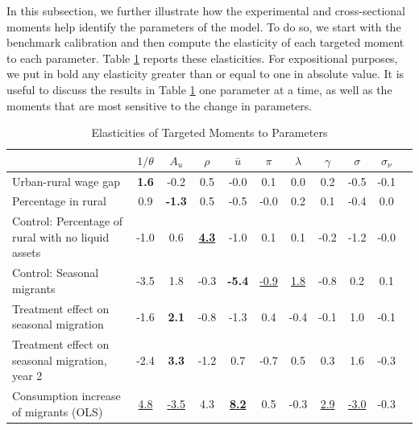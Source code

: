\documentclass[12pt,pdftex]{article}
\renewcommand{\arraystretch}{1.1}
\begin{document}
In this subsection, we further illustrate how the experimental and cross-sectional moments help identify the parameters of the model. To do so, we start with the benchmark calibration and then compute the elasticity of each targeted moment to each parameter. Table \ref{ta:elast} reports these elasticities. For expositional purposes, we put in bold any elasticity greater than or equal to one in absolute value. It is useful to discuss the results in Table \ref{ta:elast} one parameter at a time, as well as the moments that are most sensitive to the change in parameters.

\begin{table}[!h]
\small
\setlength {\tabcolsep}{2mm}
\renewcommand{\arraystretch}{1.3}
\begin{center}
\caption{Elasticities of Targeted Moments to Parameters \label{ta:elast}}
\vspace{0.3cm}
\begin{tabular}{l c c c c c c c c c c}

\hline \hline

& $1/\theta$ & $A_u$ & $\rho$ & $\bar{u}$  & $\pi$ & $\lambda$ & $\gamma$ & $\sigma$  & $\sigma_\nu$ \\


\hline

Urban-rural wage gap & \textbf{1.6} & -0.2 & 0.5 & -0.0 & 0.1 & 0.0 & 0.2  & -0.5 & -0.1 \\

Percentage in rural & 0.9 & \textbf{-1.3} & 0.5 & -0.5 & -0.0 & 0.2 & 0.1 & -0.4 & 0.0 \\

Control: Percentage of rural with no liquid assets & -1.0 & 0.6 & \underline{\textbf{4.3}} & -1.0 & 0.1 & 0.1 & -0.2 & -1.2 & -0.0 \\

Control: Seasonal migrants & -3.5 & 1.8 & -0.3 & \textbf{-5.4} & \underline{-0.9} & \underline{1.8} & -0.8  & 0.2 & 0.1 \\

Treatment effect on seasonal migration & -1.6 & \textbf{2.1} & -0.8 & -1.3 & 0.4 & -0.4 & -0.1 & 1.0 & -0.1 \\

Treatment effect on seasonal migration, year 2 & -2.4 & \textbf{3.3} & -1.2 & 0.7 & -0.7 & 0.5 & 0.3 & 1.6 & -0.3 \\

Consumption increase of migrants (OLS) & \underline{4.8} & \underline{-3.5} & 4.3 & \underline{\textbf{8.2}} & 0.5 & -0.3 & \underline{2.9} & \underline{-3.0} & -0.3 \\


\end{tabular}
\end{center}
\end{table}
\end{document}
